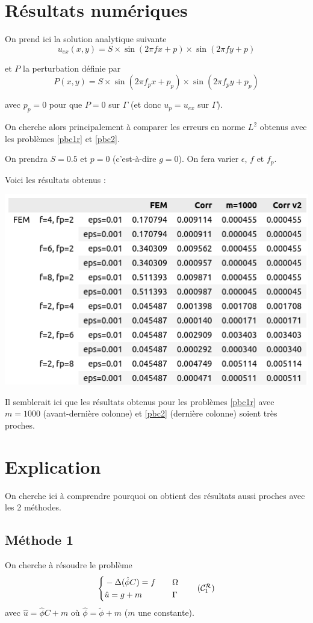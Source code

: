 \documentclass[french]{article}
\begin{document}
	\section*{Résultats numériques}
	
	On prend ici la solution analytique suivante
	$$u_{ex}(x,y) = S\times\sin(2\pi fx + p)\times\sin(2\pi fy + p)$$ 
	
	et $P$ la perturbation définie par
	$$P(x,y)=S\times\sin(2\pi f_px + p_p)\times\sin(2\pi f_py + p_p)$$
	
	avec $p_p=0$ pour que $P=0$ sur $\Gamma$ (et donc $u_p=u_{ex}$ sur $\Gamma$). 
	
	On cherche alors principalement à comparer les erreurs en norme $L^2$ obtenus avec les problèmes \ref{pbc1r} et \ref{pbc2}.
	
	On prendra $S=0.5$ et $p=0$ (c'est-à-dire $g=0$). On fera varier $\epsilon$, $f$ et $f_p$. 
	
	\newpage
	
	Voici les résultats obtenus :
	
	\begin{minipage}{\linewidth}
		\centering
		\includegraphics[width=0.55\linewidth]{resultats.png}
	\end{minipage}

	Il semblerait ici que les résultats obtenus pour les problèmes \ref{pbc1r} avec $m=1000$ (avant-dernière colonne) et \ref{pbc2} (dernière colonne) soient très proches.

	\section*{Explication}
	
	On cherche ici à comprendre pourquoi on obtient des résultats aussi proches avec les 2 méthodes.
	
	\subsection*{Méthode 1}
	
	On cherche à résoudre le problème
	\begin{equation}
		\left\{\begin{aligned}
			&-\Delta (\hat{\phi}C)=f \quad &&\Omega \\
			&\hat{u}=g+m \quad &&\Gamma
		\end{aligned}\right. \tag{$\mathcal{C}_1^\mathcal{R}$}
	\end{equation}
	avec $\hat{u}=\hat{\phi}C+m$ où $\hat{\phi}=\tilde{\phi}+m$ ($m$ une constante).
	
\end{document}
